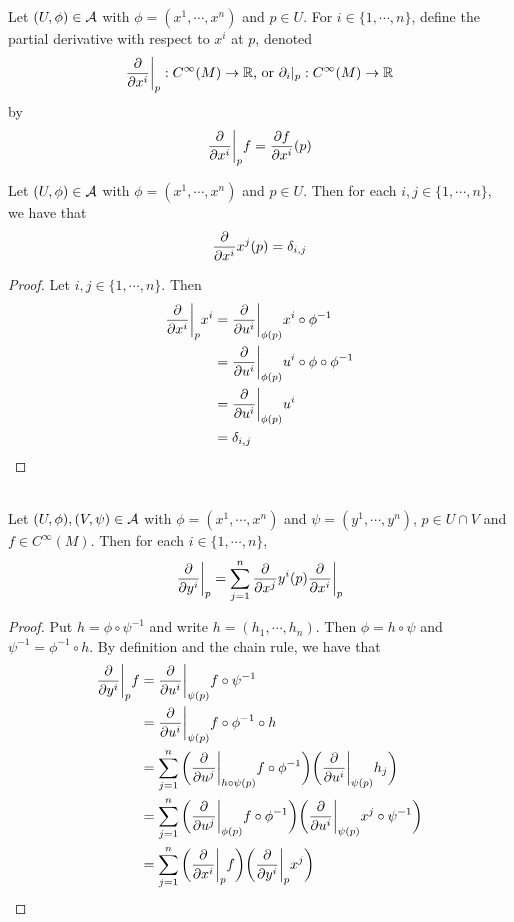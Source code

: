 \documentclass{book}
\begin{document}
	\begin{defn}
		Let $(U, \phi) \in \mathcal{A}$ with $\phi = (x^1, \cdots, x^n)$ and $p \in U$. For $i \in \{1, \cdots, n\}$, define the partial derivative with respect to $x^i$ at $p$, denoted $$\frac{\partial}{\partial x^i} \bigg|_p: C^{\infty}(M) \rightarrow \mathbb{R}  \text{, or } \partial_i|_p: C^{\infty}(M) \rightarrow \mathbb{R} $$ by $$ \frac{\partial}{\partial x^i} \bigg |_p  f =  \frac{\partial f}{\partial x^i}(p) $$
	\end{defn}

	\begin{ex}
		Let $(U, \phi) \in \mathcal{A}$ with $\phi = (x^1, \cdots, x^n)$ and $p \in U$. Then for each $i,j \in \{1, \cdots, n\}$, we have that $${\frac{\partial}{\partial x^i}{x^j}}(p) = \delta_{i,j}$$
	\end{ex}

	\begin{proof}
		Let $i,j \in \{1, \cdots, n\}$. Then 
		\begin{align*}
			\frac{\partial}{\partial x^i} \bigg|_p x^i 
			&=  \frac{\partial}{\partial u^i} \bigg|_{\phi(p)} x^i \circ \phi^{-1} \\
			&= \frac{\partial}{\partial u^i} \bigg|_{\phi(p)} u^i \circ \phi \circ \phi^{-1} \\
			&= \frac{\partial}{\partial u^i} \bigg|_{\phi(p)} u^i  \\
			&= \delta_{i,j}
		\end{align*}
	\end{proof}

	\begin{ex} \\
		Let $(U, \phi), (V, \psi) \in \mathcal{A}$ with $\phi = (x^1, \cdots, x^n)$ and $\psi = (y^1, \cdots, y^n)$, $p \in U \cap V$ and $f \in C^{\infty}(M)$. Then for each $i \in \{1, \cdots, n\}$, 
		 $$\frac{\partial}{\partial y^i} \bigg|_p = \sum_{j =1}^n {\frac{\partial}{\partial x^j}{y^i}}(p) \frac{\partial}{\partial x^i} \bigg|_p    $$
	\end{ex}

	\begin{proof}
		Put $h = \phi \circ \psi^{-1}$ and write $h = (h_1, \cdots, h_n)$. Then $\phi = h \circ \psi$ and $\psi^{-1} = \phi^{-1} \circ h$. By definition and the chain rule, we have that 
		\begin{align*}
		\frac{\partial}{\partial y^i} \bigg|_p f 
			&= \frac{\partial}{\partial u^i} \bigg|_{\psi(p)} f \circ \psi^{-1} \\
			&= \frac{\partial}{\partial u^i} \bigg|_{\psi(p)} f \circ \phi^{-1} \circ h \\
			&= \sum_{j=1}^n \bigg(\frac{\partial}{\partial u^j} \bigg|_{h \circ \psi (p)} f \circ \phi^{-1} \bigg)  \bigg( \frac{\partial}{\partial u^i} \bigg|_{\psi(p)} h_j \bigg) \\
			&= \sum_{j=1}^n \bigg(\frac{\partial}{\partial u^j} \bigg|_{\phi (p)} f \circ \phi^{-1}  \bigg) \bigg( \frac{\partial}{\partial u^i} \bigg|_{\psi(p)} x^j \circ \psi^{-1} \bigg) \\
			&= \sum_{j=1}^n \bigg( \frac{\partial}{\partial x^i} \bigg|_p f \bigg)  \bigg(   \frac{\partial}{\partial y^i} \bigg|_p x^j  \bigg)\\
		\end{align*}
	\end{proof}
\end{document}
